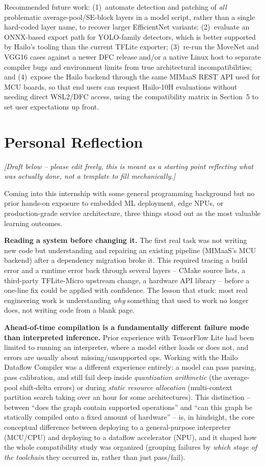 \documentclass[11pt]{article}
\begin{document}
Recommended future work: (1)~automate detection and patching of \emph{all}
problematic average-pool/SE-block layers in a model script, rather than a
single hard-coded layer name, to recover larger EfficientNet variants;
(2)~evaluate an ONNX-based export path for YOLO-family detectors, which is
better supported by Hailo's tooling than the current TFLite exporter;
(3)~re-run the MoveNet and VGG16 cases against a newer DFC release and/or a
native Linux host to separate compiler bugs and environment limits from true
architectural incompatibilities; and (4)~expose the Hailo backend through the
same MIMaaS REST API used for MCU boards, so that end users can request
Hailo-10H evaluations without needing direct WSL2/DFC access, using the
compatibility matrix in Section~5 to set user expectations up front.

\section{Personal Reflection}

\textit{[Draft below -- please edit freely, this is meant as a starting
point reflecting what was actually done, not a template to fill mechanically.]}

Coming into this internship with some general programming background but no
prior hands-on exposure to embedded ML deployment, edge NPUs, or production-grade
service architecture, three things stood out as the most valuable learning
outcomes.

\textbf{Reading a system before changing it.} The first real task was not
writing new code but understanding and repairing an existing pipeline
(MIMaaS's MCU backend) after a dependency migration broke it. This required
tracing a build error and a runtime error back through several layers --
CMake source lists, a third-party TFLite-Micro upstream change, a hardware
API library -- before a one-line fix could be applied with confidence. The
lesson that stuck: most real engineering work is understanding \emph{why}
something that used to work no longer does, not writing code from a blank
page.

\textbf{Ahead-of-time compilation is a fundamentally different failure mode
than interpreted inference.} Prior experience with TensorFlow Lite had been
limited to running an interpreter, where a model either loads or does not,
and errors are usually about missing/unsupported ops. Working with the Hailo
Dataflow Compiler was a different experience entirely: a model can pass
parsing, pass calibration, and still fail deep inside \emph{quantization
arithmetic} (the average-pool shift-delta errors) or during \emph{static
resource allocation} (multi-context partition search taking over an hour for
some architectures). This distinction -- between ``does the graph contain
supported operations'' and ``can this graph be statically compiled onto a
fixed amount of hardware'' -- is, in hindsight, the core conceptual
difference between deploying to a general-purpose interpreter (MCU/CPU) and
deploying to a dataflow accelerator (NPU), and it shaped how the whole
compatibility study was organized (grouping failures by \emph{which stage of
the toolchain} they occurred in, rather than just pass/fail).
\end{document}
